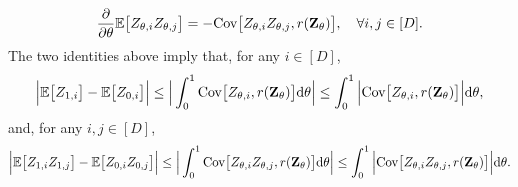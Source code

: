 \documentclass[11pt,a4paper,final]{article}
\numberwithin{equation}{section}
\theoremstyle{remark}
\newcommand{\bZ}{{\bf Z}}
\newcommand{\bbE}{{\mathbb E}}
\newcommand{\bean}{\setlength\arraycolsep{1pt}\begin{eqnarray*}}
\newcommand{\eean}{\end{eqnarray*}}
\def\d{{\rm d}}
\begin{document}
\bean
\frac{\partial}{\partial {\theta}} \bbE \big[ Z_{\theta,i} Z_{\theta,j} \big] = - \text{Cov} \big[ Z_{\theta,i} Z_{\theta, j}, r(\bZ_{\theta}) \big], \quad \forall i,j \in [D].
\eean
The two identities above imply that, for any $i \in [D]$,
\bean
\Big\vert \bbE \big[ Z_{1,i} \big] - \bbE \big[ Z_{0,i} \big] \Big\vert 
\leq \Big\vert \int_{0}^{1} \text{Cov} \big[Z_{\theta,i}, r(\bZ_{\theta}) \big] \d \theta \Big\vert
\leq  \int_{0}^{1}  \Big\vert\text{Cov} \big[Z_{\theta,i}, r(\bZ_{\theta}) \big] \Big\vert \d \theta ,
\eean
and, for any $i,j \in [D]$,
\bean
\Big\vert \bbE \big[ Z_{1,i} Z_{1,j} \big] - \bbE \big[ Z_{0,i} Z_{0,j} \big] \Big\vert 
\leq \Big\vert \int_{0}^{1} \text{Cov} \big[ Z_{\theta,i} Z_{\theta,j} , r(\bZ_{\theta}) \big] \d \theta \Big\vert
\leq  \int_{0}^{1}  \Big\vert \text{Cov} \big[ Z_{\theta,i} Z_{\theta, j} , r(\bZ_{\theta}) \big] \Big\vert \d \theta.
\eean
\end{document}
